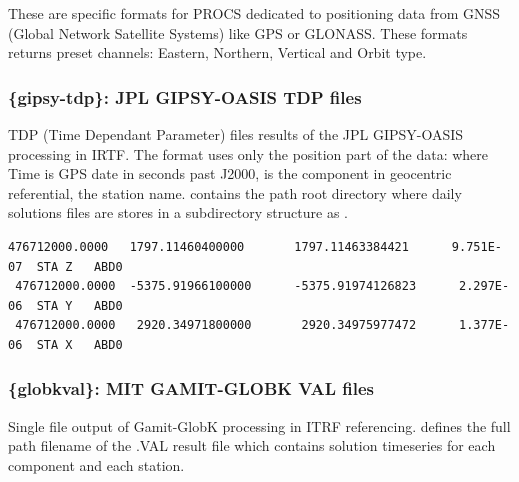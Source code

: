 These are specific formats for PROCS dedicated to positioning data from GNSS (Global Network Satellite Systems) like GPS or GLONASS. These formats returns preset channels: Eastern, Northern, Vertical and Orbit type.

\subsubsection{\{gipsy-tdp\}: JPL GIPSY-OASIS TDP files}

TDP (Time Dependant Parameter) files results of the JPL GIPSY-OASIS processing in IRTF. The format uses only the position part of the data:  where Time is GPS date in seconds past J2000,  is the component in geocentric referential,  the station name.  contains the path root directory where daily solutions files are stores in a subdirectory structure as .

\begin{lstlisting}[language={},title=GIPSY-OASIS TDP format example]
 476712000.0000   1797.11460400000       1797.11463384421      9.751E-07  STA Z   ABD0
 476712000.0000  -5375.91966100000      -5375.91974126823      2.297E-06  STA Y   ABD0
 476712000.0000   2920.34971800000       2920.34975977472      1.377E-06  STA X   ABD0
\end{lstlisting}


\subsubsection{\{globkval\}: MIT GAMIT-GLOBK VAL files}

Single file output of Gamit-GlobK processing in ITRF referencing.  defines the full path filename of the .VAL result file which contains solution timeseries for each component and each station.

